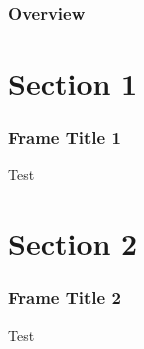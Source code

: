 \documentclass[]{beamer}
\begin{document}
{
    \begin{frame}[plain]
    \frametitle{Overview}
    \tableofcontents
    \end{frame}
}

\section{Section 1}

\begin{frame}
\frametitle{Frame Title 1}
Test
\end{frame}

\section{Section 2}

\begin{frame}
\frametitle{Frame Title 2}
Test
\end{frame}
\end{document}
